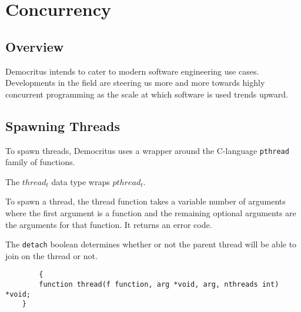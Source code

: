 \section{Concurrency}
	\subsection{Overview}
		Democritus intends to cater to modern software engineering use cases. Developments in the field are steering us more and more towards highly concurrent programming as the scale at which software is used trends upward.

		\vspace{5mm}
	\subsection{Spawning Threads}
		To spawn threads, Democritus uses a wrapper around the C-language \texttt{pthread} family of functions.

		The \texttt{$thread_t$} data type wraps \texttt{$pthread_t$}.

		To spawn a thread, the thread function takes a variable number of arguments where the first argument is a function and the remaining optional arguments are the arguments for that function. It returns an error code.

		The \texttt{detach} boolean determines whether or not the parent thread will be able to join on the thread or not.
		\begin{lstlisting}
        {	
		function thread(f function, arg *void, arg, nthreads int) *void;
	}
		\end{lstlisting}
